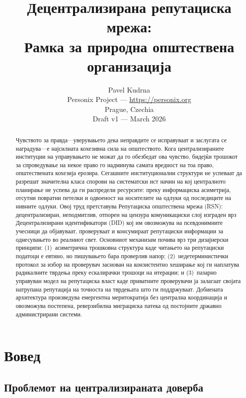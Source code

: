 \documentclass[11pt,a4paper,twocolumn]{article}
\title{\textbf{Децентрализирана репутациска мрежа:\\Рамка за природна општествена организација}}
\author{Pavel Kudrna\\Personix Project --- \url{https://personix.org}\\Prague, Czechia\\Draft v1 --- March 2026}
\date{}
\begin{document}
\maketitle

\begin{abstract}
Чувството за правда---уверувањето дека неправдите се исправуваат и заслугата се наградува---е најсилната кохезивна сила на општеството. Кога централизираните институции на управувањето не можат да го обезбедат ова чувство, бидејќи трошокот за спроведување на некое право го надминува самата вредност на тоа право, општествената кохезија ерозира. Сегашните институционални структури не успеваат да разрешат значителна класа спорови на систематски ист начин на кој централното планирање не успева да ги распредели ресурсите: преку информациска асиметрија, отсутни повратни петелки и одвоеност на носителите на одлуки од последиците на нивните одлуки. Овој труд претставува Репутациска општествена мрежа (RSN): децентрализиран, неподмитлив, отпорен на цензура комуникациски слој изграден врз Децентрализирани идентификатори (DID) кој им овозможува на псевдонимните учесници да објавуваат, проверуваат и консумираат репутациски информации за однесувањето во реалниот свет. Основниот механизам почива врз три дизајнерски принципи: (1)~асиметрична трошковна структура каде читањето на репутациски податоци е евтино, но пишувањето бара проверлив напор; (2)~недетерминистички протокол за избор на проверувач заснован на конзистентно хеширање кој ги наплатува радикалните тврдења преку ескалирачки трошоци на итерации; и (3)~пазарно управуван модел на репутациска власт каде приватните проверувачи ја залагаат својата натрупана репутација на точноста на тврдењата што ги поддржуваат. Добиената архитектура произведува емергентна меритократија без централна координација и овозможува постепена, реверзибилна миграциска патека од постојните државно администрирани системи.
\end{abstract}

\section{Вовед}

\subsection{Проблемот на централизираната доверба}
\end{document}
